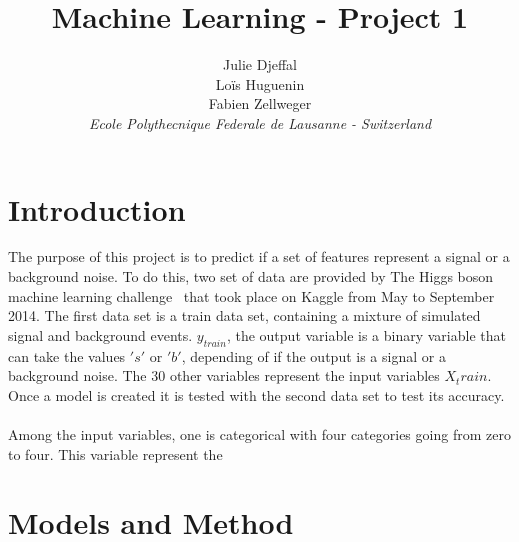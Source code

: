 \documentclass[10pt,conference,compsocconf]{IEEEtran}
\begin{document}
\title{Machine Learning - Project 1}

\author{
  Julie Djeffal \\
  Lo\"{i}s Huguenin \\
  Fabien Zellweger \\
  \textit{Ecole Polythecnique Federale de Lausanne - Switzerland}
}

\maketitle

\begin{abstract}
  
\end{abstract}

\section{Introduction}
The purpose of this project is to predict if a set of features represent a signal or a background noise. 
To do this, two set of data are provided by The Higgs boson machine learning challenge~\cite{challenge} that took place on Kaggle from May to September 2014. The first data set is a train data set, containing a mixture of simulated signal and background events.
$y_{train}$, the output variable is a binary variable that can take the values $'s'$ or $'b'$, depending of if the output is a signal or a background noise. The 30 other variables represent the input variables $X_train$. 
Once a model is created it is tested with the second data set to test its accuracy.\\
\\
Among the input variables, one is categorical with four categories going from zero to four. This variable represent the 



\section{Models and Method}
\end{document}
